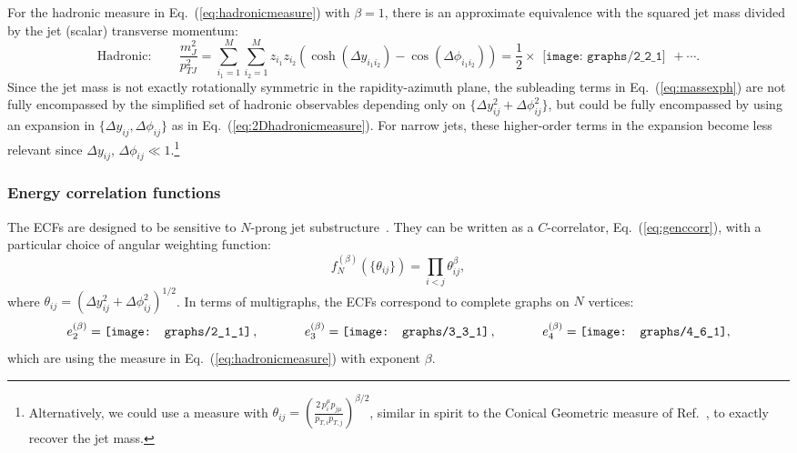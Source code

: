 \documentclass[letterpaper,11pt]{article}
\DeclareRobustCommand{\Eq}[1]{Eq.~(\ref{#1})}
\DeclareRobustCommand{\Ref}[1]{Ref.~\cite{#1}}
\newcommand{\Bs}{\text{EFPs}\xspace}
\begin{document}
For the hadronic measure in \Eq{eq:hadronicmeasure} with $\beta= 1$, there is an approximate equivalence with the squared jet mass divided by the jet (scalar) transverse momentum:
\begin{equation}\label{eq:massexph}
\text{Hadronic}: \qquad \frac{m_J^2}{p_{TJ}^2}=\sum_{i_1 = 1}^M\sum_{i_2 = 1}^M z_{i_1} z_{i_2} (\cosh(\Delta y_{i_1i_2}) - \cos(\Delta\phi_{i_1i_2})) = \frac12\times
\begin{gathered}
\texttt{[image: graphs/2\_2\_1]}
\end{gathered}
+ \cdots.
\end{equation}
%
Since the jet mass is not exactly rotationally symmetric in the rapidity-azimuth plane, the subleading terms in \Eq{eq:massexph} are not fully encompassed by the simplified set of hadronic observables depending only on $\{\Delta y_{ij}^2+\Delta\phi_{ij}^2\}$, but could be fully encompassed by using an expansion in $\{\Delta y_{ij},\Delta\phi_{ij}\}$ as in \Eq{eq:2Dhadronicmeasure}.
%
For narrow jets, these higher-order terms in the expansion become less relevant since $\Delta y_{ij},\,\Delta\phi_{ij}\ll1$.\footnote{Alternatively, we could use a measure with $\theta_{ij} = \left(\frac{2\,p_i^\mu p_{j\mu}}{p_{T,i}  p_{T,j}} \right)^{\beta/2}$, similar in spirit to the Conical Geometric measure of \Ref{Stewart:2015waa}, to exactly recover the jet mass.}


\subsubsection{Energy correlation functions}
\label{sec:equivECF}

The ECFs are designed to be sensitive to $N$-prong jet substructure~\cite{Larkoski:2013eya}.
%
They can be written as a $C$-correlator, \Eq{eq:genccorr}, with a particular choice of angular weighting function:
\begin{equation}
\label{eq:ecfs}
f_N^{(\beta)}(\{\theta_{ij}\})= \prod_{i<j} \theta^\beta_{ij},
\end{equation}
where $\theta_{ij}=(\Delta y_{ij}^2+\Delta\phi_{ij}^2)^{1/2}$.
%
In terms of multigraphs, the ECFs correspond to complete graphs on $N$ vertices:
\begin{equation}\label{eq:ecfgraphs}
e_2^{(\beta)} = \begin{gathered}
\texttt{[image: graphs/2\_1\_1]}
\end{gathered}\,,\hspace{.5in}
e_3^{(\beta)} = \begin{gathered}
\texttt{[image: graphs/3\_3\_1]}
\end{gathered}\,,\hspace{.5in}
e_4^{(\beta)} = \begin{gathered}
\texttt{[image: graphs/4\_6\_1]}
\end{gathered},
\end{equation}
which are \Bs using the measure in \Eq{eq:hadronicmeasure} with exponent $\beta$.
\end{document}
